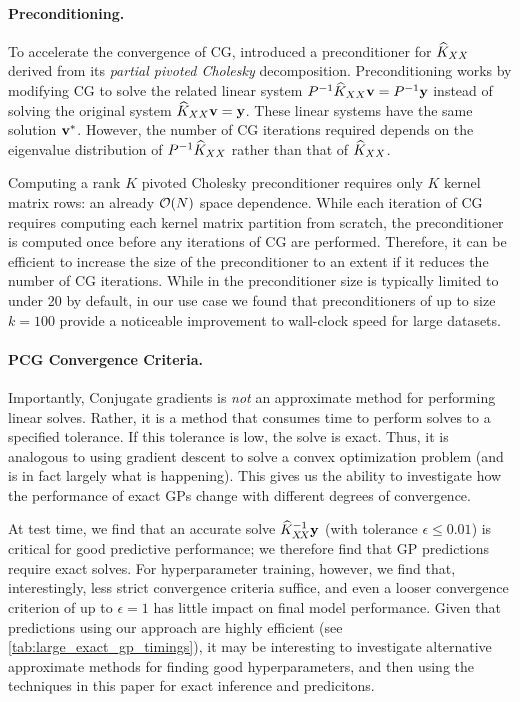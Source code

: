 \paragraph{Preconditioning.}
To accelerate the convergence of CG, \citet{gardner2018gpytorch} introduced a preconditioner for $\widehat{K}_{XX}$ derived from its \emph{partial pivoted Cholesky} decomposition. Preconditioning works by modifying CG to solve the related linear system $P^{-1} \widehat{K}_{XX} \mathbf{v} = P^{-1}\mathbf{y}$
instead of solving the original system $\widehat{K}_{XX} \mathbf{v} = \mathbf{y}$. These
linear systems have the same solution $\mathbf{v}^{*}$. However, the number of CG iterations required depends on the
eigenvalue distribution of $P^{-1}\widehat{K}_{XX}$ rather than that of $\widehat{K}_{XX}$.

Computing a rank $K$ pivoted Cholesky preconditioner requires only $K$ kernel matrix rows:
an already $\bigo{N}$ space dependence. While each iteration of CG requires computing each kernel matrix partition
from scratch, the preconditioner is computed once before any iterations of CG are performed. Therefore, it can be efficient to increase the size of the preconditioner to an extent if it reduces the number of CG iterations.
While in \citet{gardner2018gpytorch} the preconditioner size is typically limited to under 20 by default, in our use
case we found that preconditioners of up to size $k=100$ provide a noticeable improvement to wall-clock speed for large datasets.

\paragraph{PCG Convergence Criteria.}
Importantly, Conjugate gradients is \emph{not} an approximate method for performing linear solves. Rather, it is a method that consumes time to perform solves to a specified tolerance. If this tolerance is low, the solve is exact. Thus, it is analogous to using gradient descent to solve a convex optimization problem (and is in fact largely what is happening). This gives us the ability to investigate how the performance of exact GPs change with different degrees of convergence.

At test time, we find that an accurate solve $\widehat {K}_{X \! X}^{-1} \mathbf{y}$ (with tolerance $\epsilon \leq 0.01$) is critical for good predictive performance; we therefore find that GP predictions require exact solves. For hyperparameter training, however, we find that, interestingly, less strict convergence criteria suffice, and even a looser convergence criterion of up to $\epsilon = 1$ has little impact on final model performance.
Given that predictions using our approach are highly efficient (see \cref{tab:large_exact_gp_timings}), it may be interesting to investigate alternative approximate methods for finding good hyperparameters, and then using the techniques in this paper for exact inference and predicitons.
